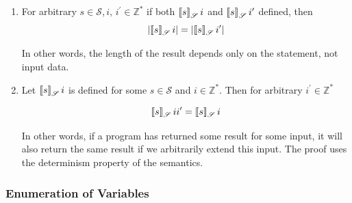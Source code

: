 \begin{enumerate}
\item For arbitrary $s\in\mathscr{S}$,$\,i,\,i^\prime\in\mathbb{Z}^*$ if both $\sembr{s}^\ph_\mathscr{S}\,i$ and $\sembr{s}^\ph_\mathscr{S}\,i^\prime$ defined, then
  \[
  |\sembr{s}^\ph_\mathscr{S}\,i|=|\sembr{s}^\ph_\mathscr{S}\,i^\prime|
  \]

  In other words, the length of the result depends only on the statement, not input data.

\item
  Let $\sembr{s}^\ph_\mathscr{S}\,i$ is defined for some $s\in\mathscr{S}$ and $i\in\mathbb{Z}^*$. Then for arbitrary $i^\prime\in\mathbb{Z}^*$

  \[
   \sembr{s}^\ph_\mathscr{S}\,ii^\prime=\sembr{s}^\ph_\mathscr{S}\,i
   \]

   In other words, if a program has returned some result for some input, it will also return the same result
   if we arbitrarily extend this input. The proof uses the determinism property of the semantics.
\end{enumerate}

\subsubsection{Enumeration of Variables}

